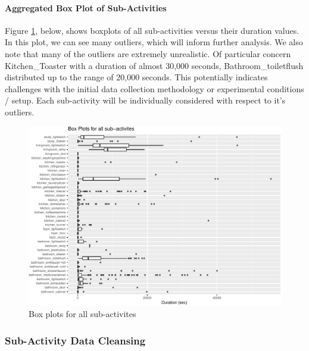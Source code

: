 \documentclass[11pt,]{article}
\let\oldparagraph\paragraph
\renewcommand{\paragraph}[1]{\oldparagraph{#1}\mbox{}}
\begin{document}
\hypertarget{aggregated-box-plot-of-sub-activities}{%
\paragraph{Aggregated Box Plot of
Sub-Activities}\label{aggregated-box-plot-of-sub-activities}}

Figure \ref{fig:FIG_allBoxPlots}, below, shows boxplots of all
sub-activities versus their duration values. In this plot, we can see
many outliers, which will inform further analysis. We also note that
many of the outliers are extremely unrealistic. Of particular concern
Kitchen\_Toaster with a duration of almost 30,000 seconds,
Bathroom\_toiletflush distributed up to the range of 20,000 seconds.
This potentially indicates challenges with the initial data collection
methodology or experimental conditions / setup. Each sub-activity will
be individually considered with respect to it's outliers.

\begin{figure}[H]

{\centering \includegraphics{MD_Final_files/figure-latex/FIG_allBoxPlots-1} 

}

\caption{Box plots for all sub-activites}\label{fig:FIG_allBoxPlots}
\end{figure}

\hypertarget{sub-activity-data-cleansing}{%
\subsubsection{Sub-Activity Data
Cleansing}\label{sub-activity-data-cleansing}}
\end{document}
